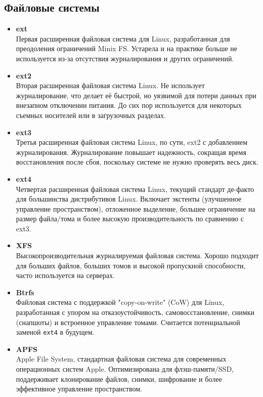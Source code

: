 \documentclass[10pt]{article}
\begin{document}
\subsection*{Файловые системы}
\begin{itemize}
\item \textbf{ext}\\
Первая расширенная файловая система для Linux, разработанная для преодоления ограничений Minix FS. Устарела и на практике больше не используется из-за отсутствия журналирования и других ограничений.

\item \textbf{ext2}\\
Вторая расширенная файловая система Linux. Не использует журналирование, что делает её быстрой, но уязвимой для потери данных при внезапном отключении питания. До сих пор используется для некоторых съемных носителей или в загрузочных разделах.

\item \textbf{ext3}\\
Третья расширенная файловая система Linux, по сути, ext2 с добавлением журналирования. Журналирование повышает надежность, сокращая время восстановления после сбоя, поскольку системе не нужно проверять весь диск.

\item \textbf{ext4}\\
Четвертая расширенная файловая система Linux, текущий стандарт де-факто для большинства дистрибутивов Linux. Включает экстенты (улучшенное управление пространством), отложенное выделение, большее ограничение на размер файла/тома и более высокую производительность по сравнению с ext3.

\item \textbf{XFS}\\
Высокопроизводительная журналируемая файловая система. Хорошо подходит для больших файлов, больших томов и высокой пропускной способности, часто используется на серверах.

\item \textbf{Btrfs}\\
Файловая система с поддержкой "copy-on-write" (CoW) для Linux, разработанная с упором на отказоустойчивость, самовосстановление, снимки (снапшоты) и встроенное управление томами. Считается потенциальной заменой \texttt{ext4} в будущем.

\item \textbf{APFS}\\
Apple File System, стандартная файловая система для современных операционных систем Apple. Оптимизирована для флэш-памяти/SSD, поддерживает клонирование файлов, снимки, шифрование и более эффективное управление пространством.


\end{itemize}
\end{document}
